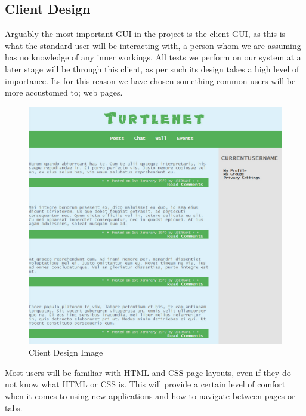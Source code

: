 \subsection{Client Design}
Arguably the most important GUI in the project is the client GUI, as this is what
the standard user will be interacting with, a person whom we are assuming has no
knowledge of any inner workings. All tests we perform on our system at a later 
stage will be through this client, as per such its design takes a high level of
importance. Its for this reason we have chosen something common users will be 
more accustomed to; web pages.

\begin{figure}[h]
    \centering
    \includegraphics[width=\textwidth]{images/design/client_interface.jpg}
    \caption{Client Design Image}
    \label{fig:client}
\end{figure}

Most users will be familiar with HTML and CSS page layouts, even if they do not
know what HTML or CSS is. This will provide a certain level of comfort when it 
comes to using new applications and how to navigate between pages or tabs.

